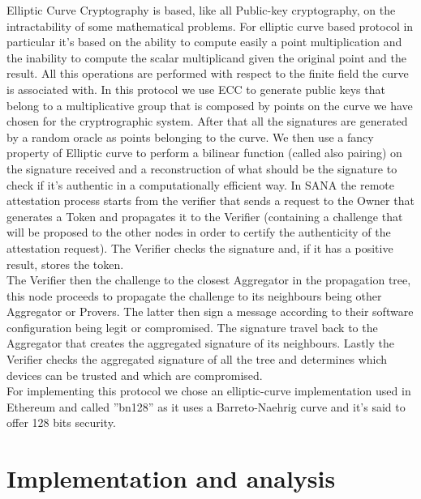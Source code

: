 \documentclass[10pt, a4paper, twocolumn]{article} %
\begin{document}
Elliptic Curve Cryptography is based, like all Public-key cryptography, on the intractability of some mathematical problems.
For elliptic curve based protocol in particular it's based on the ability to compute easily a point multiplication and the inability to compute the scalar multiplicand given the original point and the result.
All this operations are performed with respect to the finite field the curve is associated with.
In this protocol we use ECC to generate public keys that belong to a multiplicative group that is composed by points on the curve we have chosen for the cryptrographic system.
After that all the signatures are generated by a random oracle as points belonging to the curve. We then use a fancy property of Elliptic curve to perform a bilinear function (called also pairing) on the signature received and a reconstruction of what should be the signature to check if it's authentic in a computationally efficient way.
In SANA the remote attestation process starts from the verifier that sends a request to the Owner that generates a Token and propagates it to the Verifier (containing a challenge that will be proposed to the other nodes in order to certify the authenticity of the attestation request). The Verifier checks the signature and, if it has a positive result, stores the token. \\The Verifier then
the challenge to the closest Aggregator in the propagation tree, this node proceeds to propagate the challenge to its neighbours being other Aggregator
or Provers. The latter then sign a message according to their software configuration being legit or compromised. The signature travel back to the Aggregator
that creates the aggregated signature of its neighbours. Lastly the Verifier checks the aggregated signature of all the tree and determines which devices
can be trusted and which are compromised.\\
For implementing this protocol we chose an elliptic-curve implementation used in Ethereum and called ''bn128'' as it uses a Barreto-Naehrig curve and it's said to offer 128 bits security.


\section{Implementation and analysis}
\end{document}
